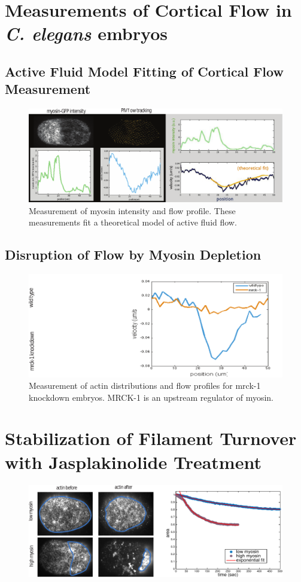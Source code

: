 \section{Measurements of Cortical Flow in \textit{C. elegans} embryos}

\subsection{Active Fluid Model Fitting of Cortical Flow Measurement}

\begin{figure}[h!]
	\centering
	\includegraphics[width=\hsize]{data/prelim_flow.pdf}
	\caption{\label{fig:measure_flow}  Measurement of myosin intensity and flow profile.  These measurements fit a theoretical model of active fluid flow.  }
\end{figure}


\subsection{Disruption of Flow by Myosin Depletion}

\begin{figure}[h!]
	\centering
	\includegraphics[width=\hsize]{data/flow_mrck_kd.pdf}
	\caption{\label{fig:measure_flow_nomyo}  Measurement of actin distributions and flow profiles for mrck-1 knockdown embryos.  MRCK-1 is an upstream regulator of myosin.  }
\end{figure}



\section{Stabilization of Filament Turnover with Jasplakinolide Treatment}

\begin{figure}[h!]
	\centering
	\includegraphics[width=\hsize]{data/jasp_flow_stop.pdf}
	\caption{\label{fig:jasp_flow_stop}    }
\end{figure}